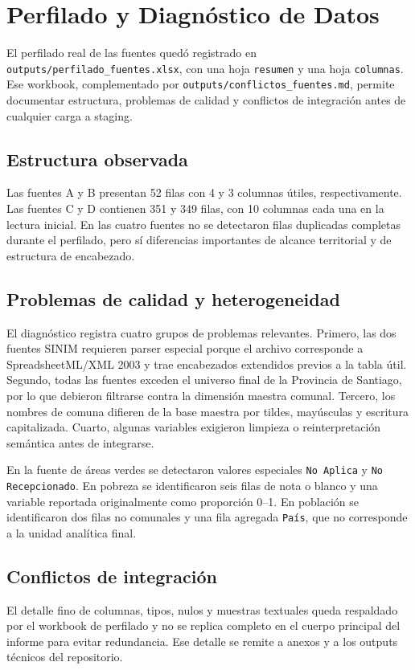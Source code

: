 \chapter{Perfilado y Diagnóstico de Datos}

El perfilado real de las fuentes quedó registrado en \texttt{outputs/perfilado\_fuentes.xlsx}, con una hoja \texttt{resumen} y una hoja \texttt{columnas}. Ese workbook, complementado por \texttt{outputs/conflictos\_fuentes.md}, permite documentar estructura, problemas de calidad y conflictos de integración antes de cualquier carga a staging.

\section{Estructura observada}

Las fuentes A y B presentan 52 filas con 4 y 3 columnas útiles, respectivamente. Las fuentes C y D contienen 351 y 349 filas, con 10 columnas cada una en la lectura inicial. En las cuatro fuentes no se detectaron filas duplicadas completas durante el perfilado, pero sí diferencias importantes de alcance territorial y de estructura de encabezado.



\section{Problemas de calidad y heterogeneidad}

El diagnóstico registra cuatro grupos de problemas relevantes. Primero, las dos fuentes SINIM requieren parser especial porque el archivo corresponde a SpreadsheetML/XML 2003 y trae encabezados extendidos previos a la tabla útil. Segundo, todas las fuentes exceden el universo final de la Provincia de Santiago, por lo que debieron filtrarse contra la dimensión maestra comunal. Tercero, los nombres de comuna difieren de la base maestra por tildes, mayúsculas y escritura capitalizada. Cuarto, algunas variables exigieron limpieza o reinterpretación semántica antes de integrarse.

En la fuente de áreas verdes se detectaron valores especiales \texttt{No Aplica} y \texttt{No Recepcionado}. En pobreza se identificaron seis filas de nota o blanco y una variable reportada originalmente como proporción 0--1. En población se identificaron dos filas no comunales y una fila agregada \texttt{País}, que no corresponde a la unidad analítica final.

\section{Conflictos de integración}



El detalle fino de columnas, tipos, nulos y muestras textuales queda respaldado por el workbook de perfilado y no se replica completo en el cuerpo principal del informe para evitar redundancia. Ese detalle se remite a anexos y a los outputs técnicos del repositorio.
